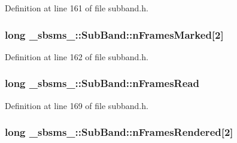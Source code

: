 Definition at line 161 of file subband.\+h.

\subsubsection[{\texorpdfstring{n\+Frames\+Marked}{nFramesMarked}}]{\setlength{\rightskip}{0pt plus 5cm}long \+\_\+sbsms\+\_\+\+::\+Sub\+Band\+::n\+Frames\+Marked\mbox{[}2\mbox{]}\hspace{0.3cm}{\ttfamily [protected]}}\hypertarget{class__sbsms___1_1_sub_band_aa7e5db8cd143139a92f238c664e3b3f3}{}\label{class__sbsms___1_1_sub_band_aa7e5db8cd143139a92f238c664e3b3f3}


Definition at line 162 of file subband.\+h.

\subsubsection[{\texorpdfstring{n\+Frames\+Read}{nFramesRead}}]{\setlength{\rightskip}{0pt plus 5cm}long \+\_\+sbsms\+\_\+\+::\+Sub\+Band\+::n\+Frames\+Read\hspace{0.3cm}{\ttfamily [protected]}}\hypertarget{class__sbsms___1_1_sub_band_a06474c8927ad9fc1079a3af45ef85f0f}{}\label{class__sbsms___1_1_sub_band_a06474c8927ad9fc1079a3af45ef85f0f}


Definition at line 169 of file subband.\+h.

\subsubsection[{\texorpdfstring{n\+Frames\+Rendered}{nFramesRendered}}]{\setlength{\rightskip}{0pt plus 5cm}long \+\_\+sbsms\+\_\+\+::\+Sub\+Band\+::n\+Frames\+Rendered\mbox{[}2\mbox{]}\hspace{0.3cm}{\ttfamily [protected]}}\hypertarget{class__sbsms___1_1_sub_band_a458d065c8824c5e9a792a25922e951a7}{}\label{class__sbsms___1_1_sub_band_a458d065c8824c5e9a792a25922e951a7}


